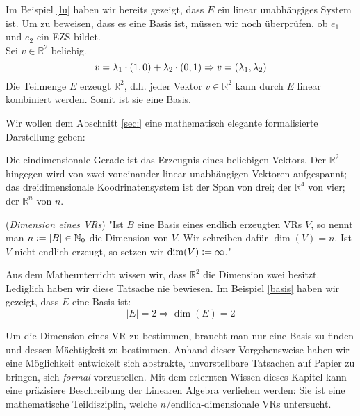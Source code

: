 \begin{example} \label{basis}
Im Beispiel \ref{lu} haben wir bereits gezeigt, dass $E$ ein linear unabhängiges System ist. Um zu beweisen, dass es eine Basis ist, müssen wir noch überprüfen, ob $e_1$ und $e_2$ ein \acl{EZS} bildet.
\\ Sei $v\in \mathbb{R}^2$ beliebig. 
\[v=\lambda_1\cdot(1,0)+\lambda_2\cdot (0,1)\\
\Rightarrow v=(\lambda_1,\lambda_2)\]
Die Teilmenge $E$ erzeugt $\mathbb{R}^2$, d.h. jeder Vektor $v \in \mathbb{R}^2$ kann durch $E$ linear kombiniert werden. Somit ist sie eine Basis.
\end{example}

Wir wollen dem Abschnitt \ref{sec:} eine mathematisch elegante formalisierte Darstellung geben:
\begin{example}
Die eindimensionale Gerade ist das Erzeugnis eines beliebigen Vektors. Der $\mathbb{R}^2$ hingegen wird von zwei voneinander linear unabhängigen Vektoren aufgespannt; das dreidimensionale Koodrinatensystem ist der Span von drei; der $\mathbb{R}^4$ von vier; der $\mathbb{R}^n$ von $n$. 
\end{example}

\theoremstyle{definition}
\begin{definition}\cite[S. 504]{Enzy} (\emph{Dimension eines \acl{VR}s}) \label{def:dim}"Ist $B$ eine Basis eines endlich erzeugten \acl{VR}s $V$, so nennt man $n \vcentcolon= |B| \in \mathbb{N}_0$ die Dimension von $V$. Wir schreiben dafür $\dim(V)= n$. Ist $V$ nicht endlich erzeugt, so setzen wir $\dim(V)\vcentcolon= \infty$." 
\end{definition}

\begin{example}
Aus dem Matheunterricht wissen wir, dass $\mathbb{R}^2$ die Dimension zwei besitzt. Lediglich haben wir diese Tatsache nie bewiesen. Im Beispiel \ref{basis} haben wir gezeigt, dass $E$ eine Basis ist:
\[|E|=2\Rightarrow\dim(E)=2\]
\end{example}

Um die Dimension eines \acl{VR} zu bestimmen, braucht man nur eine Basis zu finden und dessen Mächtigkeit zu bestimmen. Anhand dieser Vorgehensweise haben wir eine Möglichkeit entwickelt sich abstrakte, unvorstellbare Tatsachen auf Papier zu bringen, sich \emph{formal} vorzustellen. Mit dem erlernten Wissen dieses Kapitel kann eine präzisiere Beschreibung der Linearen Algebra verliehen werden: Sie ist eine mathematische Teildisziplin, welche $n$/endlich-dimensionale \aclp{VR} untersucht. 
